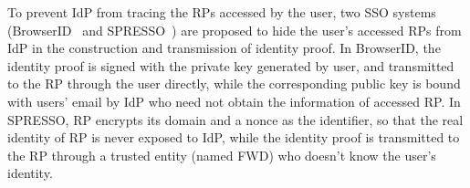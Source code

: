 
To prevent IdP from tracing the RPs accessed by the user, two SSO systems (BrowserID~\cite{persona} and SPRESSO~\cite{SPRESSO}) are proposed to hide the user's accessed RPs from IdP in the construction and transmission of identity proof. In BrowserID, the identity proof is signed with the private key generated by user, and transmitted to the RP through the user directly,  while the corresponding  public key is bound with users' email by IdP who need not obtain the information of accessed RP. In SPRESSO, RP encrypts its domain and a nonce as the identifier, so that the real identity of RP is never exposed to IdP, while the identity proof is transmitted to the RP through a trusted entity (named FWD) who doesn't know the user's identity.



